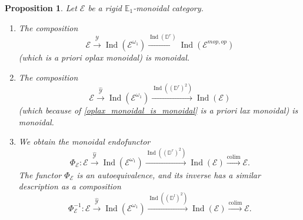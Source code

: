 \documentclass[11pt,leqno]{amsart}
\newtheorem{prop}[theo]{Proposition}
\numberwithin{equation}{section}
\DeclareMathOperator*{\colim}{colim}
\newcommand{\xto}{\xrightarrow}
\newcommand{\bbD}{{\mathbb D}}
\newcommand{\bE}{{\mathbb E}}
\newcommand{\cE}{{\mathcal E}}
\newcommand{\cY}{{\mathcal Y}}
\newcommand{\Ind}{\operatorname{Ind}}
\begin{document}
\begin{prop}\label{prop:autoequivalence_rigid_monoidal}
Let $\cE$ be a rigid $\bE_1$-monoidal category.
\begin{enumerate}[label=(\roman*), ref=(\roman*)]
\item The composition
\begin{equation}\label{eq:D^r_is_monoidal_functor}
\cE\xto{\hat{\cY}}\Ind(\cE^{\omega_1})\xto{\Ind(\bbD^r)}\Ind(\cE^{mop,op})
\end{equation}
(which is a priori oplax monoidal) is monoidal. \label{oplax_monoidal_is_monoidal}
\item The composition
\begin{equation*}
	\cE\xto{\hat{\cY}}\Ind(\cE^{\omega_1})\xto{\Ind((\bbD^r)^2)}\Ind(\cE)
\end{equation*}
(which because of \ref{oplax_monoidal_is_monoidal} is a priori lax monoidal) is monoidal.
\label{lax_monoidal_is_monoidal}
\item We obtain the monoidal endofunctor
\begin{equation*}
\Phi_{\cE}:\cE\xto{\hat{\cY}}\Ind(\cE^{\omega_1})\xto{\Ind((\bbD^r)^2)}\Ind(\cE)\xto{\colim}\cE.
\end{equation*}
The functor $\Phi_{\cE}$ is an autoequivalence, and its inverse has a similar description as a composition
\begin{equation*}
\Phi^{-1}_{\cE}:\cE\xto{\hat{\cY}}\Ind(\cE^{\omega_1})\xto{\Ind((\bbD^l)^2)}\Ind(\cE)\xto{\colim}\cE.
\end{equation*} \label{autoequivalence}
\end{enumerate}
\end{prop}
\end{document}
